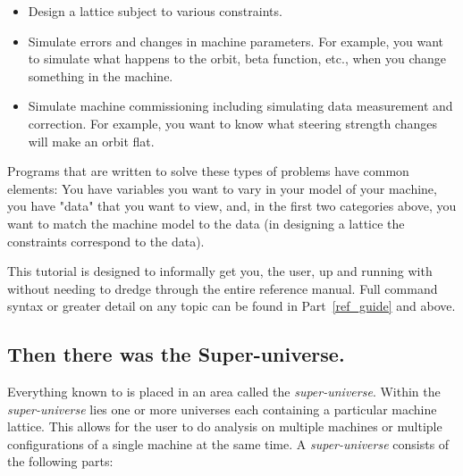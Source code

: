\begin{itemize}
\item 
Design a lattice subject to various constraints.
\item
Simulate errors and changes in machine parameters. For example, you want to
simulate what happens to the orbit, beta function, etc., when you change
something in the machine. 
\item 
Simulate machine commissioning including simulating data measurement and
correction. For example, you want to know what steering strength changes will
make an orbit flat.
\end{itemize}

Programs that are written to solve these types of problems have common
elements: You have variables you want to vary in your model of your
machine, you have "data" that you want to view, and, in the first two
categories above, you want to match the machine model to the data (in
designing a lattice the constraints correspond to the data).

This tutorial is designed to informally get you, the user, up and
running with \tao without needing to dredge through the entire
reference manual. Full command syntax or greater detail on any topic
can be found in Part~\ref{ref_guide} and above.

\subsection{Then there was the Super-universe.}
\label{s:super_universe}

Everything known to \tao is placed in an area called the
\textit{super-universe}. Within the \textit{super-universe} lies one
or more universes each containing a particular machine lattice. This
allows for the user to do analysis on multiple machines or multiple
configurations of a single machine at the same time. A
\textit{super-universe} consists of the following parts:

